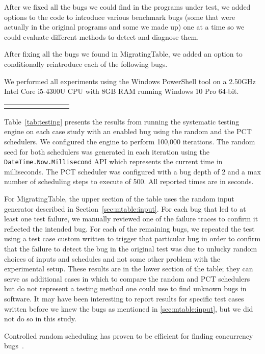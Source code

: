 After we fixed all the bugs we could find in the programs under test, we added options to the code to introduce various benchmark bugs (some that were actually in the original programs and some we made up) one at a time so we could evaluate different methods to detect and diagnose them.

After fixing all the bugs we found in MigratingTable, we added an option to conditionally reintroduce each of the following bugs.

We performed all experiments using the Windows PowerShell tool on a 2.50GHz Intel Core i5-4300U CPU with 8GB RAM running Windows 10 Pro 64-bit.

\setlength{\tabcolsep}{.72em}
\begin{table*}[t]
\small
\centering
\begin{tabular}{rl rrr rrr}
\centering

\end{tabular}
\caption{Results from running the \psharp random and PCT systematic testing schedulers for 100,000 iterations. We report: time in seconds to find a bug (Time to Bug); number of scheduling steps when a bug was found (\#SS); and if a bug was found with a particular scheduler (BF?).}
\label{tab:testing}
\end{table*}

Table~\ref{tab:testing} presents the results from running the \psharp systematic testing engine on each case study with an enabled bug using the random and the PCT schedulers. We configured the engine to perform 100,000 iterations. The random seed for both schedulers was generated in each iteration using the \texttt{DateTime.Now.Millisecond} API which represents the current time in milliseconds. The PCT scheduler was configured with a bug depth of 2 and a max number of scheduling steps to execute of 500. All reported times are in seconds.

For MigratingTable, the upper section of the table uses the random input generator described in Section~\ref{sec:mtable:input}.  For each bug that led to at least one test failure, we manually reviewed one of the failure traces to confirm it reflected the intended bug.  For each of the remaining bugs, we repeated the test using a test case custom written to trigger that particular bug in order to confirm that the failure to detect the bug in the original test was due to unlucky random choices of inputs and schedules and not some other problem with the experimental setup.  These results are in the lower section of the table; they can serve as additional cases in which to compare the random and PCT schedulers but do not represent a testing method one could use to find unknown bugs in software.  It may have been interesting to report results for specific test cases written before we knew the bugs as mentioned in \ref{sec:mtable:input}, but we did not do so in this study.

Controlled random scheduling has proven to be efficient for finding concurrency bugs~\cite{thomson2014sct, deligiannis2015psharp}.
